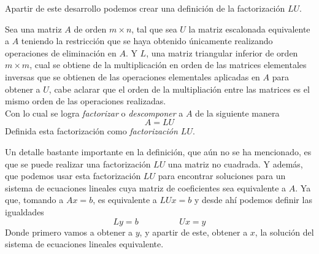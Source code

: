     Apartir de este desarrollo podemos crear una definición de la factorización \(LU\).
    \begin{definition}
        Sea una matriz \(A\) de orden \(m \times n\), tal que sea \(U\) la matriz escalonada equivalente a \(A\) teniendo la 
        restricción que se haya obtenido únicamente realizando operaciones de eliminación en \(A\). Y \(L\), una matriz 
        triangular inferior de orden \(m \times m\), cual se obtiene de la multiplicación en orden de las matrices elementales inversas 
        que se obtienen de las operaciones elementales aplicadas en \(A\) para obtener a \(U\), cabe aclarar que el orden de la multipliación entre 
        las matrices es el mismo orden de las operaciones realizadas. \\
        Con lo cual se logra \emph{factorizar} o \emph{descomponer} a \(A\) de la siguiente manera
        \[
            A = LU
        \]
        Definida esta factorización como \emph{factorización \(LU\)}.
    \end{definition}
    Un detalle bastante importante en la definición, que aún no se ha mencionado, es que se puede realizar una factorización \(LU\) una matriz no cuadrada. 
    Y además, que podemos usar esta factorización \(LU\) para encontrar soluciones para un sistema de ecuaciones lineales cuya matriz de coeficientes sea equivalente a \(A\).
    Ya que, tomando a \(Ax = b\), es equivalente a \(LUx = b\) y desde ahí podemos definir las igualdades
    \[
        Ly = b
        \hspace{2cm}
        Ux = y
    \]
    Donde primero vamos a obtener a \(y\), y apartir de este, obtener a \(x\), la solución del sistema de ecuaciones lineales equivalente.

